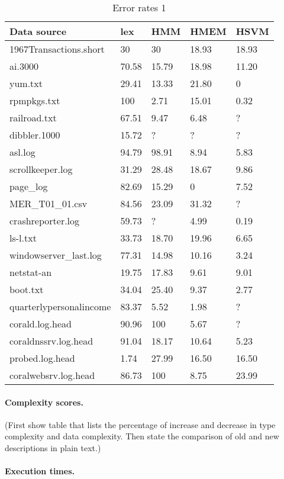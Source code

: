 \begin{table}
\begin{center}
\begin{tabular}{|l||l|l|l|l|} \hline
Data source                & lex   & HMM   & HMEM  & HSVM \\\hline\hline
1967Transactions.short     & 30    & 30    & 18.93 & 18.93 \\ \hline
ai.3000                    & 70.58 & 15.79 & 18.98 & 11.20 \\ \hline
yum.txt                    & 29.41 & 13.33 & 21.80 & 0     \\ \hline
rpmpkgs.txt                & 100   & 2.71  & 15.01 & 0.32  \\ \hline
railroad.txt               & 67.51 & 9.47  & 6.48  & ?     \\ \hline
dibbler.1000               & 15.72 & ?     & ?     & ?     \\ \hline
asl.log                    & 94.79 & 98.91 & 8.94  & 5.83  \\ \hline
scrollkeeper.log           & 31.29 & 28.48 & 18.67 & 9.86  \\ \hline
page\_log                  & 82.69 & 15.29 & 0     & 7.52  \\ \hline
MER\_T01\_01.csv           & 84.56 & 23.09 & 31.32 & ?     \\ \hline
crashreporter.log          & 59.73 & ?     & 4.99  & 0.19  \\ \hline 
ls-l.txt                   & 33.73 & 18.70 & 19.96 & 6.65  \\ \hline
windowserver\_last.log     & 77.31 & 14.98 & 10.16 & 3.24  \\ \hline
netstat-an                 & 19.75 & 17.83 & 9.61  & 9.01  \\ \hline
boot.txt                   & 34.04 & 25.40 & 9.37  & 2.77  \\ \hline
quarterlypersonalincome    & 83.37 & 5.52  & 1.98  & ?     \\ \hline
corald.log.head            & 90.96 & 100   & 5.67  & ?     \\ \hline
coraldnssrv.log.head       & 91.04 & 18.17 & 10.64 & 5.23  \\ \hline
probed.log.head            & 1.74  & 27.99 & 16.50 & 16.50 \\ \hline
coralwebsrv.log.head       & 86.73 & 100   & 8.75  & 23.99 \\ \hline
  
\end{tabular}
\caption{Error rates 1}
\label{tab:error1}
\end{center}
\end{table}

\paragraph*{Complexity scores.}

(First show table that lists the percentage of increase and decrease in type
complexity and data complexity. Then state the comparison of old and
new descriptions in plain text.)

\paragraph*{Execution times.}

